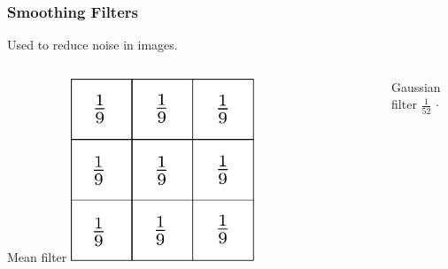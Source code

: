 \begin{frame}
    \frametitle{Smoothing Filters}
    Used to reduce noise in images.
    \begin{columns}[T, onlytextwidth]
        \begin{column}{0.45\textwidth}
            \begin{block}{Mean filter}\centering\bigskip\bigskip
                \includegraphics[width=0.5\textwidth]{images/mean}
            \end{block}
        \end{column}
        \begin{column}{0.45\textwidth}
            \begin{block}{Gaussian filter}\centering\bigskip\bigskip
                $\displaystyle\frac{1}{52}\,\cdot\,$ 
            \end{block}
        \end{column}
    \end{columns}
\end{frame}

